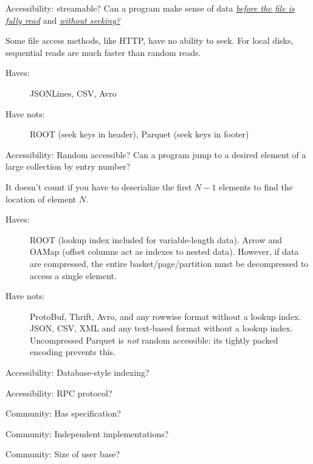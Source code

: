 \documentclass[aspectratio=169]{beamer}
\begin{document}
\begin{frame}{Accessibility: streamable?}
\vspace{0.5 cm}
Can a program make sense of data \underline{\it before the file is fully read} and \underline{\it without seeking?}

\vfill

Some file access methods, like HTTP, have no ability to seek. For local disks, sequential reads are much faster than random reads.

\vfill

\begin{description}
\item[Haves:] JSONLines, CSV, Avro
\item[Have nots:] ROOT (seek keys in header), Parquet (seek keys in footer)
\end{description}
\end{frame}

\begin{frame}{Accessibility: Random accessible?}
\vspace{0.5 cm}
Can a program jump to a desired element of a large collection by entry number?

\vfill
It doesn't count if you have to deserialize the first $N-1$ elements to find the location of element $N$.

\vfill

\begin{description}
\item[Haves:] ROOT (lookup index included for variable-length data). Arrow and OAMap (offset columns act as indexes to nested data). However, if data are compressed, the entire basket/page/partition must be decompressed to access a single element.
\item[Have nots:] ProtoBuf, Thrift, Avro, and any rowwise format without a lookup index. JSON, CSV, XML and any text-based format without a lookup index. Uncompressed Parquet is {\it not} random accessible: its tightly packed encoding prevents this.
\end{description}
\end{frame}

\begin{frame}{Accessibility: Database-style indexing?}
\vspace{0.5 cm}
\end{frame}

\begin{frame}{Accessibility: RPC protocol?}
\vspace{0.5 cm}
\end{frame}

\begin{frame}{Community: Has specification?}
\vspace{0.5 cm}
\end{frame}

\begin{frame}{Community: Independent implementations?}
\vspace{0.5 cm}
\end{frame}

\begin{frame}{Community: Size of user base?}
\vspace{0.5 cm}
\end{frame}
\end{document}
